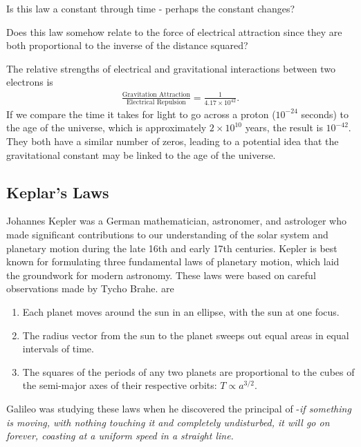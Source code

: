 \begin{questions}
	\item Is this law a constant through time - perhaps the constant changes?
	\item Does this law somehow relate to the force of electrical attraction since they are both proportional to the inverse of the distance squared?
\end{questions}

\begin{interestnote}
	The relative strengths of electrical and gravitational interactions between two electrons is
 	\begin{align}
  		\frac{\text{Gravitation Attraction}}{\text{Electrical Repulsion}} = \frac{1}{4.17\times 10^{42}}.
  	\end{align}
   	If we compare the time it takes for light to go across a proton ($10^{-24}$ seconds) to the age of the universe, which is approximately $2\times 10^{10}$ years, the result is $10^{-42}$. They both have a similar number of zeros, leading to a potential idea that the gravitational constant may be linked to the age of the universe.
\end{interestnote}

\subsection{Keplar's Laws}

Johannes Kepler was a German mathematician, astronomer, and astrologer who made significant contributions to our understanding of the solar system and planetary motion during the late 16th and early 17th centuries. Kepler is best known for formulating three fundamental laws of planetary motion, which laid the groundwork for modern astronomy. These laws were based on careful observations made by Tycho Brahe.  are
\begin{enumerate}
	\item Each planet moves around the sun in an ellipse, with the sun at one focus.
 	\item The radius vector from the sun to the planet sweeps out equal areas in equal intervals of time.
  	\item The squares of the periods of any two planets are proportional to the cubes of the semi-major axes of their respective orbits: $T\propto a^{3/2}$.
\end{enumerate}

Galileo was studying these laws when he discovered the principal of -\textit{if something is moving, with nothing touching it and completely undisturbed, it will go on forever, coasting at a uniform speed in a straight line.}

